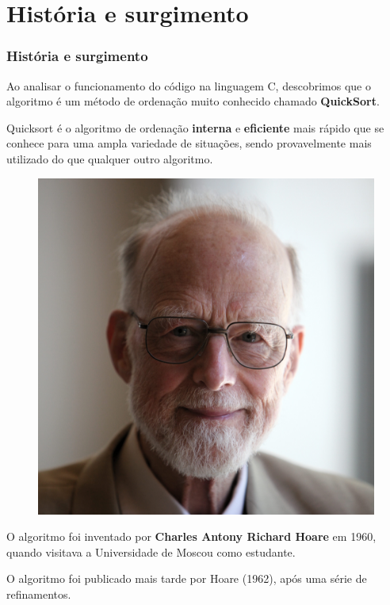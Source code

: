 \documentclass[
	11pt, %
]{beamer}
\begin{document}
\section{História e surgimento}
\begin{frame}
	\frametitle{História e surgimento}
	
	\footnotesize
	\justifying Ao analisar o funcionamento do código na linguagem C, descobrimos que o algoritmo é um método de ordenação muito conhecido chamado \textbf{QuickSort}.
	
	\bigskip
	
	\justifying Quicksort é o algoritmo de ordenação \textbf{interna} e \textbf{eficiente} mais rápido que se conhece para uma ampla variedade de situações, sendo provavelmente mais utilizado do que qualquer outro algoritmo.
	
	\bigskip
	\begin{figure}
		\includegraphics[width=1\linewidth]{Sir_Tony_Hoare_IMG_5125.jpg}
	\end{figure}

	O algoritmo foi inventado por \textbf{Charles Antony Richard Hoare} em 1960, quando visitava a Universidade de Moscou como estudante.
	
	\bigskip
	O algoritmo foi publicado mais tarde por Hoare (1962), após uma série de refinamentos.
	

\end{frame}
\end{document}
